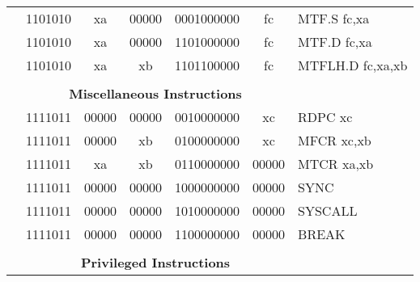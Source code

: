\begin{table}[p]
\begin{small}
\begin{center}
\begin{tabular}{rcccccccccl}
&
\multicolumn{2}{|c|}{1101010} &
\multicolumn{1}{c|}{xa} &
\multicolumn{1}{c|}{00000} &
\multicolumn{4}{c|}{0001000000} &
\multicolumn{1}{c|}{fc} & MTF.S fc,xa \\
\cline{2-10}
  

&
\multicolumn{2}{|c|}{1101010} &
\multicolumn{1}{c|}{xa} &
\multicolumn{1}{c|}{00000} &
\multicolumn{4}{c|}{1101000000} &
\multicolumn{1}{c|}{fc} & MTF.D fc,xa \\
\cline{2-10}
  

&
\multicolumn{2}{|c|}{1101010} &
\multicolumn{1}{c|}{xa} &
\multicolumn{1}{c|}{xb} &
\multicolumn{4}{c|}{1101100000} &
\multicolumn{1}{c|}{fc} & MTFLH.D fc,xa,xb \\
\cline{2-10}
  

&
\multicolumn{9}{c}{} & \\
&
\multicolumn{9}{c}{\bf Miscellaneous Instructions} & \\
\cline{2-10}
  

&
\multicolumn{2}{|c|}{1111011} &
\multicolumn{1}{c|}{00000} &
\multicolumn{1}{c|}{00000} &
\multicolumn{4}{c|}{0010000000} &
\multicolumn{1}{c|}{xc} & RDPC xc \\
\cline{2-10}
  

&
\multicolumn{2}{|c|}{1111011} &
\multicolumn{1}{c|}{00000} &
\multicolumn{1}{c|}{xb} &
\multicolumn{4}{c|}{0100000000} &
\multicolumn{1}{c|}{xc} & MFCR xc,xb \\
\cline{2-10}
  

&
\multicolumn{2}{|c|}{1111011} &
\multicolumn{1}{c|}{xa} &
\multicolumn{1}{c|}{xb} &
\multicolumn{4}{c|}{0110000000} &
\multicolumn{1}{c|}{00000} & MTCR xa,xb \\
\cline{2-10}
  

&
\multicolumn{2}{|c|}{1111011} &
\multicolumn{1}{c|}{00000} &
\multicolumn{1}{c|}{00000} &
\multicolumn{4}{c|}{1000000000} &
\multicolumn{1}{c|}{00000} & SYNC  \\
\cline{2-10}
  

&
\multicolumn{2}{|c|}{1111011} &
\multicolumn{1}{c|}{00000} &
\multicolumn{1}{c|}{00000} &
\multicolumn{4}{c|}{1010000000} &
\multicolumn{1}{c|}{00000} & SYSCALL  \\
\cline{2-10}
  

&
\multicolumn{2}{|c|}{1111011} &
\multicolumn{1}{c|}{00000} &
\multicolumn{1}{c|}{00000} &
\multicolumn{4}{c|}{1100000000} &
\multicolumn{1}{c|}{00000} & BREAK  \\
\cline{2-10}
  

&
\multicolumn{9}{c}{} & \\
&
\multicolumn{9}{c}{\bf Privileged Instructions} & \\
\cline{2-10}
  


\end{tabular}
\end{center}
\end{small}
\end{table}

